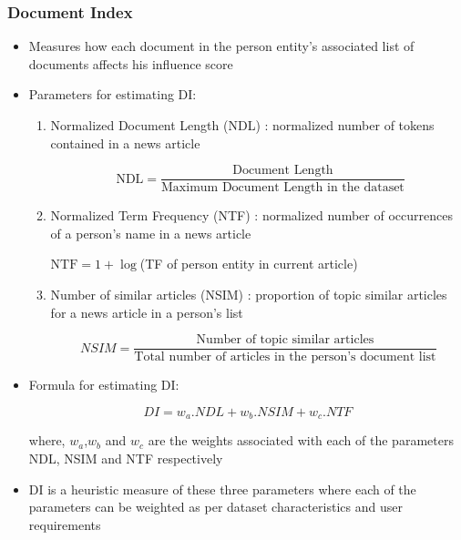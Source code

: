 \documentclass{beamer}
\begin{document}
\begin{frame}[allowframebreaks]
\frametitle{Document Index}
\begin{itemize}
\item
Measures how each document in the person entity's associated list of documents affects his influence score
\item
Parameters for estimating DI:
\begin{enumerate}
\item
\alert{ Normalized Document Length} (NDL) : normalized number of tokens contained in a news article

$$\text{ NDL}=\dfrac{\text{Document Length}} {\text{Maximum Document Length in the dataset}}$$

\item
\alert{Normalized Term Frequency} (NTF) : normalized number of occurrences of a person's name in a news article\\ \vspace{0.15in}

$\text{NTF}=	1	+\log	$(TF of person entity in current article)\\ \vspace{0.1in}

\item  
\alert{Number of similar articles} (NSIM) :  proportion of topic similar articles for a news article in a person's list

$$NSIM= \dfrac{\text{Number of topic similar articles}} {\text{Total number of articles in the person's document list}}$$

\end{enumerate}

\item
Formula for estimating DI:

\begin{block}{}
$$DI = w_a . NDL + w_b . NSIM + w_c . NTF $$
\end{block}
where, $w_a$,$ w_b$ and $w_c$ are the weights associated with each of the parameters NDL, NSIM and NTF respectively

\item
DI is a heuristic measure of these three parameters where each of the parameters can be weighted as per dataset characteristics and user requirements
\end{itemize}
\end{frame}
\end{document}
